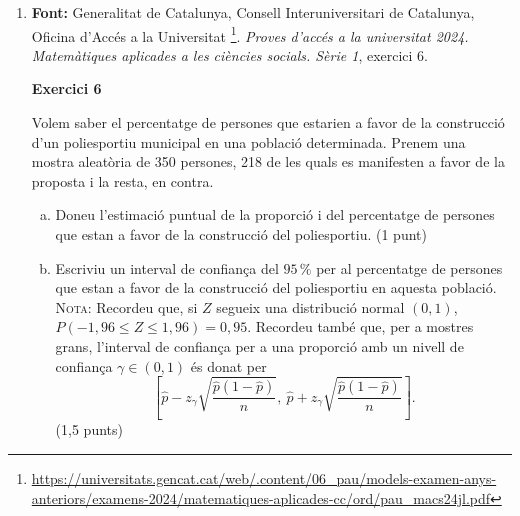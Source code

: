 \begin{enumerate}
\begin{enumerate}[a)]
 \textbf{Fórmules per a resoldre l'exercici:}
 \begin{itemize}
  \item $Z \sim \mbox{normal}(0,1) \rightarrow P(-1{,}96 \leq Z \leq 1{,}96) = 0{,}95$ i $P(-2{,}58 \leq Z \leq 2{,}58) = 0{,}99$
  \item Intervals de confiança amb un nivell de confiança $\gamma \in (0,1)$
  \begin{itemize}
   \item [---] per a la proporció (mostres grans):
   $$\left[\hat{p}-z_{\gamma}\sqrt{\frac{\hat{p}(1-\hat{p})}{n}},\ \hat{p}+z_{\gamma}\sqrt{\frac{\hat{p}(1-\hat{p})}{n}}\right]$$
   \item[---] per a la mitjana (mostres normals amb la variància $\sigma^2$ coneguda):
   $$\left[\bar{x}-z_{\gamma}\frac{\sigma}{\sqrt{n}},\ \bar{x}+z_{\gamma}\frac{\sigma}{\sqrt{n}}\right]$$
   \item[---] per a la mitjana (mostres grans amb la variància $\sigma^2$ desconeguda):
   $$\left[\bar{x}-z_{\gamma}\frac{s}{\sqrt{n}},\ \bar{x}+z_{\gamma}\frac{s}{\sqrt{n}}\right]$$
  \end{itemize}

 \end{itemize}
 \end{enumerate}
\vspace{2cm}

 \item \textbf{Font:} Generalitat de Catalunya, Consell Interuniversitari de Catalunya, Oficina d'Accés a la Universitat \footnote{\url{https://universitats.gencat.cat/web/.content/06_pau/models-examen-anys-anteriors/examens-2024/matematiques-aplicades-cc/ord/pau_macs24jl.pdf}}. \textit{Proves d'accés a la universitat 2024. Matemàtiques aplicades a les ciències socials. Sèrie 1}, exercici 6.

 \textbf{Exercici 6}

 Volem saber el percentatge de persones que estarien a favor de la construcció d'un poliesportiu municipal en una població determinada. Prenem una mostra aleatòria de 350 persones, 218 de les quals es manifesten a favor de la proposta i la resta, en contra.
 \begin{enumerate}[a)]
 \item Doneu l'estimació puntual de la proporció i del percentatge de persones que estan a favor de la construcció del poliesportiu. (1 punt)
 \item Escriviu un interval de confiança del $95\,\%$ per al percentatge de persones que estan a favor de la construcció del poliesportiu en aquesta població. \textsc{Nota:} Recordeu que, si $Z$ segueix una distribució normal $(0,1)$, $P(-1{,}96 \leq Z \leq 1{,}96) = 0{,}95$. Recordeu també que, per a mostres grans, l'interval de confiança per a una proporció amb un nivell de confiança $\gamma \in (0,1)$ és donat per $$\left[\hat{p}-z_{\gamma}\sqrt{\frac{\hat{p}(1-\hat{p})}{n}},\ \hat{p}+z_{\gamma}\sqrt{\frac{\hat{p}(1-\hat{p})}{n}}\right].$$ (1,5 punts)


\end{enumerate}
\end{enumerate}
